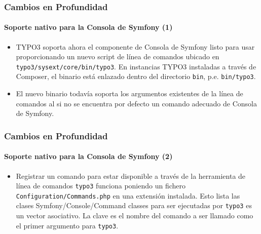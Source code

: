 \begin{frame}[fragile]
	\frametitle{Cambios en Profundidad}
	\framesubtitle{Soporte nativo para la Consola de Symfony (1)}

	\lstset{basicstyle=\tiny\ttfamily}

	\begin{itemize}

		\item TYPO3 soporta ahora el componente de Consola de Symfony listo para usar proporcionando
			un nuevo script de línea de comandos ubicado en \texttt{typo3/sysext/core/bin/typo3}.
			En instancias TYPO3 instaladas a través de Composer, el binario está enlazado dentro del
			directorio \texttt{bin}, p.e. \texttt{bin/typo3}.

		\item El nuevo binario todavía soporta los argumentos existentes de la línea de comandos al
			si no se encuentra por defecto un comando adecuado de Consola de Symfony.

	\end{itemize}

\end{frame}

\begin{frame}[fragile]
	\frametitle{Cambios en Profundidad}
	\framesubtitle{Soporte nativo para la Consola de Symfony (2)}

	\lstset{basicstyle=\tiny\ttfamily}

	\begin{itemize}

		\item Registrar un comando para estar disponible a través de la herramienta de línea de comandos \texttt{typo3}
			funciona poniendo un fichero \texttt{Configuration/Commands.php} en una
			extensión instalada. Esto lista las clases Symfony/Console/Command classes para ser
			ejecutadas por \texttt{typo3} es un vector asociativo. La clave es el nombre del
			comando a ser llamado como el primer argumento para \texttt{typo3}.

	\end{itemize}

\end{frame}

